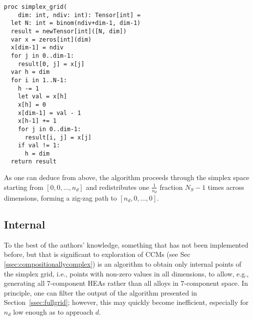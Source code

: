 \begin{verbatim}
proc simplex_grid(
    dim: int, ndiv: int): Tensor[int] =
  let N: int = binom(ndiv+dim-1, dim-1)
  result = newTensor[int]([N, dim])
  var x = zeros[int](dim)
  x[dim-1] = ndiv
  for j in 0..dim-1:
    result[0, j] = x[j]
  var h = dim
  for i in 1..N-1:
    h -= 1
    let val = x[h]
    x[h] = 0
    x[dim-1] = val - 1
    x[h-1] += 1
    for j in 0..dim-1:
      result[i, j] = x[j]
    if val != 1:
      h = dim
  return result
\end{verbatim}

As one can deduce from above, the algorithm proceeds through the simplex space starting from $[0, 0, ..., n_d]$ and redistributes one $\frac{1}{n_d}$ fraction $N_S-1$ times across dimensions, forming a zig-zag path to $[n_d, 0, ..., 0]$.

\subsection{Internal} \label{ssec:internalgrid}

To the best of the authors' knowledge, something that has not been implemented before, but that is significant to exploration of CCMs  (see Sec \ref{ssec:compositionallycomplex}) is an algorithm to obtain only internal points of the simplex grid, i.e., points with non-zero values in all dimensions, to allow, e.g., generating all 7-component HEAs rather than all alloys in 7-component space. In principle, one can filter the output of the algorithm presented in Section~\ref{ssec:fullgrid}; however, this may quickly become inefficient, especially for $n_d$ low enough as to approach $d$. 

